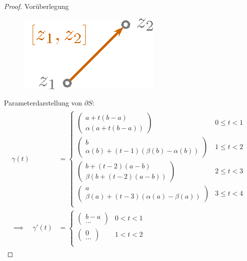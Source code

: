 \documentclass[a4paper,10pt]{scrbook}
\begin{document}
\begin{theorem}
  \begin{proof} Vorüberlegung
    \begin{figure}[H]
      \centering
      \includegraphics[scale=0.2]{images/ana3-tmp-63}
    \end{figure}
    Parameterdarstellung von $\partial S$:
    \begin{gather*}
      \begin{aligned}
        \gamma(t) &=
        \begin{cases}
          \begin{pmatrix} a + t(b-a) \\ \alpha(a + t(b-a)) \end{pmatrix} & 0 \leq t < 1 \\
          \begin{pmatrix} b \\ \alpha(b) + (t-1) (\beta(b) - \alpha(b)) \end{pmatrix} & 1 \leq t < 2 \\
          \begin{pmatrix} b + (t-2) (a-b) \\ \beta(b + (t-2) (a-b)) \end{pmatrix} & 2 \leq t < 3 \\
          \begin{pmatrix} a \\ \beta(a) + (t-3) (\alpha(a) - \beta(a)) \end{pmatrix} & 3 \leq t < 4 \\
        \end{cases} \\
        \implies \quad
        \gamma'(t) &=
        \begin{cases}
          \begin{pmatrix} b-a \\ \ldots \end{pmatrix} & 0 < t < 1 \\
          \begin{pmatrix} 0 \\ \ldots \end{pmatrix} & 1 < t < 2 \\

\end{cases}
\end{aligned}
\end{gather*}
\end{proof}
\end{theorem}
\end{document}
